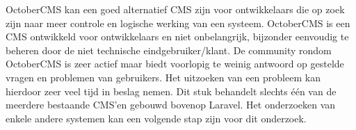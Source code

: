 \newline\newline
OctoberCMS kan een goed alternatief CMS zijn voor ontwikkelaars die op zoek zijn naar meer controle en logische werking van een systeem. OctoberCMS is een CMS ontwikkeld voor ontwikkelaars en niet onbelangrijk, bijzonder eenvoudig te beheren door de niet technische eindgebruiker/klant.
De community rondom OctoberCMS is zeer actief maar biedt voorlopig te weinig antwoord op gestelde vragen en problemen van gebruikers. Het uitzoeken van een probleem kan hierdoor zeer veel tijd in beslag nemen.
\newline\newline
Dit stuk behandelt slechts één van de meerdere bestaande CMS'en gebouwd bovenop Laravel. Het onderzoeken van enkele andere systemen kan een volgende stap zijn voor dit onderzoek.